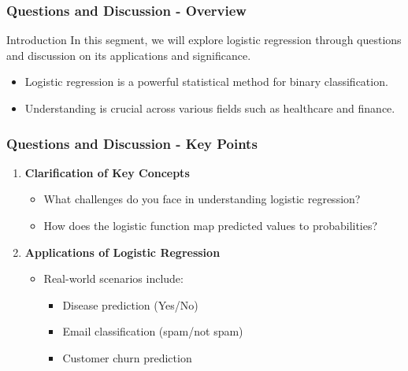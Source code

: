 \documentclass[aspectratio=169]{beamer}
\begin{document}
\begin{frame}[fragile]
  \frametitle{Questions and Discussion - Overview}
  \begin{block}{Introduction}
    In this segment, we will explore logistic regression through questions and discussion on its applications and significance.
  \end{block}
  \begin{itemize}
    \item Logistic regression is a powerful statistical method for binary classification.
    \item Understanding is crucial across various fields such as healthcare and finance.
  \end{itemize}
\end{frame}

\begin{frame}[fragile]
  \frametitle{Questions and Discussion - Key Points}
  \begin{enumerate}
    \item \textbf{Clarification of Key Concepts}
      \begin{itemize}
        \item What challenges do you face in understanding logistic regression?
        \item How does the logistic function map predicted values to probabilities?
      \end{itemize}
    \item \textbf{Applications of Logistic Regression}
      \begin{itemize}
        \item Real-world scenarios include:
          \begin{itemize}
            \item Disease prediction (Yes/No)
            \item Email classification (spam/not spam)
            \item Customer churn prediction
          \end{itemize}
      \end{itemize}
  \end{enumerate}
\end{frame}
\end{document}
